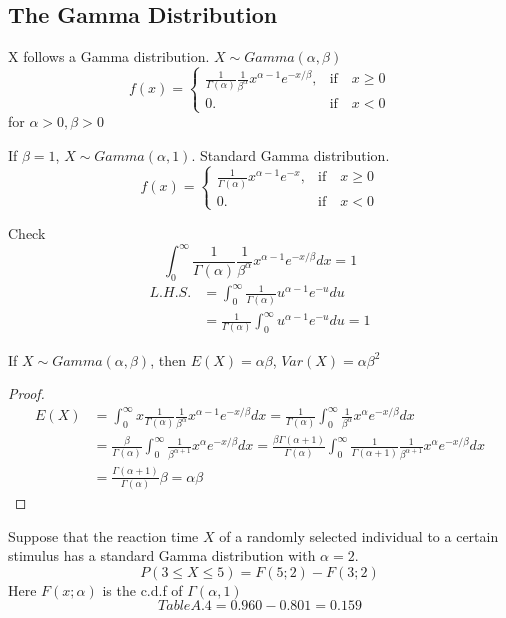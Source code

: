\subsection{The Gamma Distribution}
\begin{defn}
X follows a Gamma distribution. $X \sim Gamma(\alpha,\beta)$
\[f(x)=\begin{cases}
\frac{1}{\Gamma(\alpha)} \frac{1}{\beta^{\alpha}} x^{\alpha-1} e^{-x/\beta}, & \text{if} \quad x\geq 0\\
0. & \text{if} \quad x < 0
\end{cases}\]
for $\alpha>0, \beta>0$
\end{defn}

If $\beta=1$, $X \sim Gamma(\alpha,1)$. Standard Gamma distribution.
\[f(x)=\begin{cases}
\frac{1}{\Gamma(\alpha)}  x^{\alpha-1} e^{-x}, & \text{if} \quad x\geq 0\\
0. & \text{if} \quad x < 0
\end{cases}\]

Check
\[\int_{0}^{\infty}\frac{1}{\Gamma(\alpha)}  \frac{1}{\beta^{\alpha}} x^{\alpha-1} e^{-x/\beta} dx=1\]
\begin{align*}
L.H.S.&=\int_{0}^{\infty}\frac{1}{\Gamma(\alpha)}   u^{\alpha-1} e^{-u} du \\
&=\frac{1}{\Gamma(\alpha)} \int_{0}^{\infty} u^{\alpha-1} e^{-u} du=1
\end{align*}

\begin{prop}
If $X\sim Gamma(\alpha,\beta)$, then $E(X)=\alpha\beta$, $Var(X)=\alpha\beta^2$
\begin{proof}
\begin{align*}
E(X)&=\int_{0}^{\infty}x \frac{1}{\Gamma(\alpha)} \frac{1}{\beta^{\alpha}} x^{\alpha-1} e^{-x/\beta} dx = \frac{1}{\Gamma(\alpha)} \int_{0}^{\infty} \frac{1}{\beta^{\alpha}} x^{\alpha} e^{-x/\beta} dx  \\
&=\frac{\beta}{\Gamma(\alpha)} \int_{0}^{\infty} \frac{1}{\beta^{\alpha+1}} x^{\alpha} e^{-x/\beta} dx =  \frac{\beta \Gamma(\alpha+1)}{\Gamma(\alpha)} \int_{0}^{\infty}\frac{1}{\Gamma(\alpha+1)}  \frac{1}{\beta^{\alpha+1}} x^{\alpha} e^{-x/\beta} dx \\
&=\frac{\Gamma(\alpha+1)}{\Gamma(\alpha)}\beta =\alpha\beta
\end{align*}
\end{proof}
\end{prop}

\begin{exmp}
Suppose that the reaction time $X$ of a randomly selected individual to a certain stimulus has a standard Gamma distribution with $\alpha=2$.
\[P(3 \leq X \leq 5)=F(5;2)-F(3;2)\]
Here $F(x;\alpha)$ is the c.d.f of $\Gamma(\alpha,1)$
\[Table A.4=0.960-0.801=0.159\]
\end{exmp}

